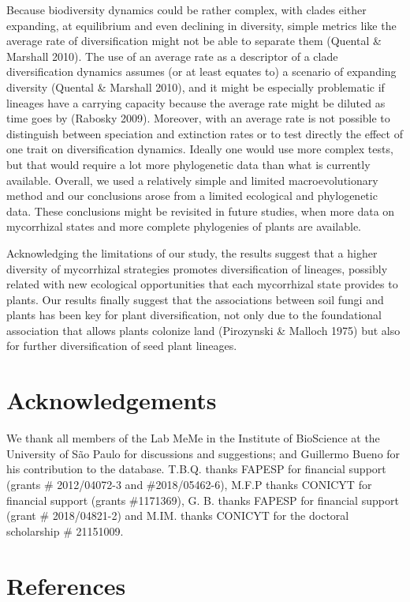 \documentclass[12pt,]{article}
\begin{document}
Because biodiversity dynamics could be rather complex, with clades
either expanding, at equilibrium and even declining in diversity, simple
metrics like the average rate of diversification might not be able to
separate them (Quental \& Marshall 2010). The use of an average rate as
a descriptor of a clade diversification dynamics assumes (or at least
equates to) a scenario of expanding diversity (Quental \& Marshall
2010), and it might be especially problematic if lineages have a
carrying capacity because the average rate might be diluted as time goes
by (Rabosky 2009). Moreover, with an average rate is not possible to
distinguish between speciation and extinction rates or to test directly
the effect of one trait on diversification dynamics. Ideally one would
use more complex tests, but that would require a lot more phylogenetic
data than what is currently available. Overall, we used a relatively
simple and limited macroevolutionary method and our conclusions arose
from a limited ecological and phylogenetic data. These conclusions might
be revisited in future studies, when more data on mycorrhizal states and
more complete phylogenies of plants are available.

Acknowledging the limitations of our study, the results suggest that a
higher diversity of mycorrhizal strategies promotes diversification of
lineages, possibly related with new ecological opportunities that each
mycorrhizal state provides to plants. Our results finally suggest that
the associations between soil fungi and plants has been key for plant
diversification, not only due to the foundational association that
allows plants colonize land (Pirozynski \& Malloch 1975) but also for
further diversification of seed plant lineages.

\hypertarget{acknowledgements}{%
\section{Acknowledgements}\label{acknowledgements}}

We thank all members of the Lab MeMe in the Institute of BioScience at
the University of São Paulo for discussions and suggestions; and
Guillermo Bueno for his contribution to the database. T.B.Q. thanks
FAPESP for financial support (grants \# 2012/04072-3 and
\#2018/05462-6), M.F.P thanks CONICYT for financial support (grants
\#1171369), G. B. thanks FAPESP for financial support (grant \#
2018/04821-2) and M.IM. thanks CONICYT for the doctoral scholarship \#
21151009.

\hypertarget{references}{%
\section{References}\label{references}}
\end{document}
